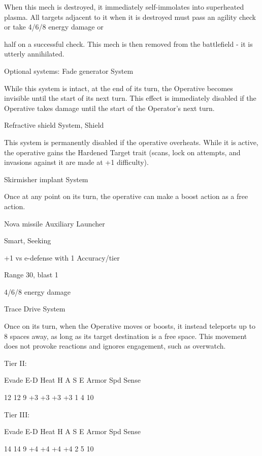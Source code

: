 When this mech is destroyed, it immediately self-immolates into superheated plasma. All targets  
adjacent to it when it is destroyed must pass an agility check or take 4/6/8 energy damage or  

                                                                                                           


half on a successful check. This mech is then removed from the battlefield - it is utterly  
annihilated.
 

Optional systems:  
Fade generator  
System
 
While this system is intact, at the end of its turn, the Operative becomes invisible until the start of  
its next turn. This effect is immediately disabled if the Operative takes damage until the start of  
the Operator’s next turn.
 

Refractive shield  
System, Shield
 
This system is permanently disabled if the operative overheats. While it is active, the operative  
gains the Hardened Target trait (scans, lock on attempts, and invasions against it are made at +1  
difficulty).
 

Skirmisher implant  
System
 
Once at any point on its turn, the operative can make a boost action as a free action.
 

Nova missile  
Auxiliary Launcher
 
Smart, Seeking
 
+1 vs e-defense with 1 Accuracy/tier
 
Range 30, blast 1
 
4/6/8 energy damage
 

Trace Drive  
System
 
Once on its turn, when the Operative moves or boosts, it instead teleports up to 8 spaces away,  
as long as its target destination is a free space. This movement does not provoke reactions and  
ignores engagement, such as overwatch.
 

Tier II:	
 

          Evade    E-D    Heat     H    A     S     E       Armor        Spd      Sense 

          12       12     9       +3    +3    +3    +3      1            4        10 

Tier III:
 

          Evade    E-D    Heat     H    A     S     E       Armor        Spd      Sense 

          14       14     9       +4    +4    +4    +4      2            5        10 
